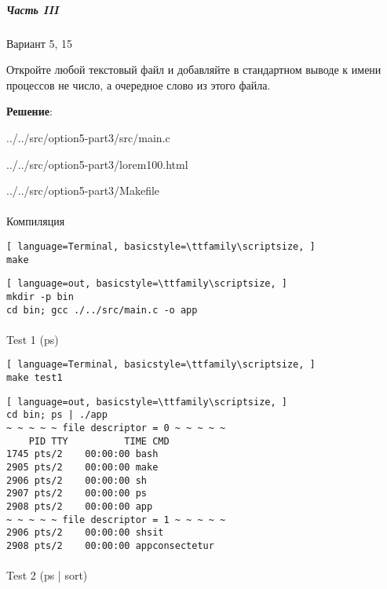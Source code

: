 \subparagraph{Часть III} Вариант 5, 15

Откройте любой текстовый файл и добавляйте в стандартном выводе к имени процессов не число, а очередное слово из этого файла.

\textbf{Решение}:


{../../src/option5-part3/src/main.c}


{../../src/option5-part3/lorem100.html}

\newpage


{../../src/option5-part3/Makefile}

\paragraph{}
Компиляция

\begin{lstlisting}[ language=Terminal, basicstyle=\ttfamily\scriptsize, ]
make
\end{lstlisting}

\begin{lstlisting}[ language=out, basicstyle=\ttfamily\scriptsize, ]
mkdir -p bin
cd bin; gcc ./../src/main.c -o app
\end{lstlisting}

\paragraph{}
Test 1 (ps)

\begin{lstlisting}[ language=Terminal, basicstyle=\ttfamily\scriptsize, ]
make test1
\end{lstlisting}

\begin{lstlisting}[ language=out, basicstyle=\ttfamily\scriptsize, ]
cd bin; ps | ./app
~ ~ ~ ~ ~ file descriptor = 0 ~ ~ ~ ~ ~
    PID TTY          TIME CMD
1745 pts/2    00:00:00 bash
2905 pts/2    00:00:00 make
2906 pts/2    00:00:00 sh
2907 pts/2    00:00:00 ps
2908 pts/2    00:00:00 app
~ ~ ~ ~ ~ file descriptor = 1 ~ ~ ~ ~ ~
2906 pts/2    00:00:00 shsit
2908 pts/2    00:00:00 appconsectetur
\end{lstlisting}

\paragraph{}
Test 2 (ps | sort)


